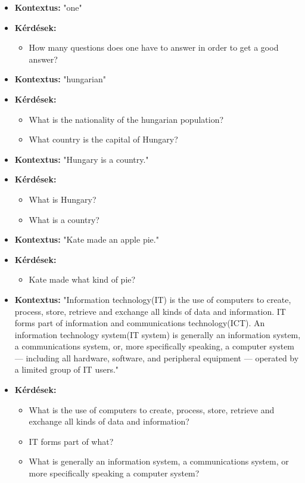 \begin{itemize}
\item \textbf{Kontextus:} "one"
\item \textbf{Kérdések:} 
	\begin{itemize}
		\item How many questions does one have to answer in order to get a 					good answer?
	\end{itemize}
\item \textbf{Kontextus:} "hungarian"
\item \textbf{Kérdések: }
	\begin{itemize}
		\item What is the nationality of the hungarian population?
		\item What country is the capital of Hungary?
	\end{itemize}
\item \textbf{Kontextus:} "Hungary is a country."
\item \textbf{Kérdések:}
	\begin{itemize}
		\item What is Hungary?
		\item What is a country?
	\end{itemize}
\item \textbf{Kontextus:} "Kate made an apple pie."
\item \textbf{Kérdések:}
	\begin{itemize}
		\item Kate made what kind of pie?
	\end{itemize}
\item \textbf{Kontextus:} "Information technology(IT) is the use of computers to create, process, store, retrieve and exchange all kinds of data and information. IT forms part of information and communications technology(ICT). An information technology system(IT system) is generally an information system, a communications system, or, more specifically speaking, a computer system — including all hardware, software, and peripheral equipment — operated by a limited group of IT users."
\item \textbf{Kérdések:}
	\begin{itemize}
		\item What is the use of computers to create, process, store, retrieve and exchange all kinds of data and information?
		\item IT forms part of what?
		\item What is generally an information system, a communications system, or more specifically speaking a computer system?
	\end{itemize}
\end{itemize}